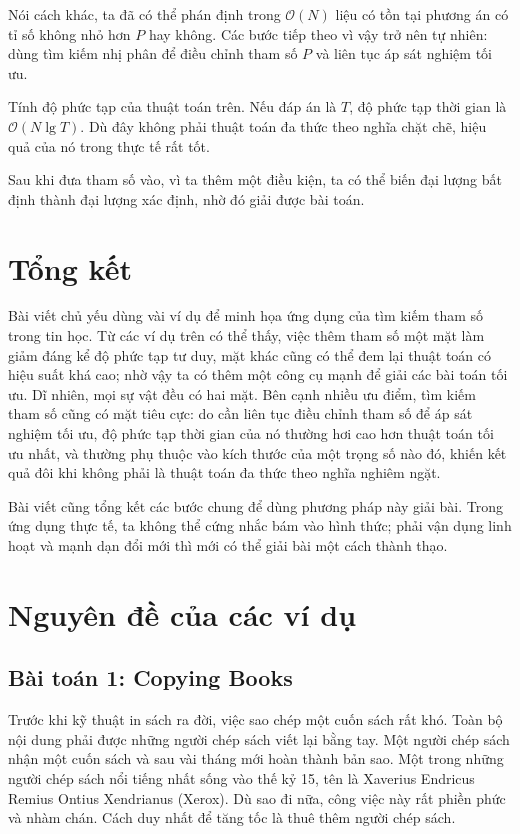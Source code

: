 \documentclass[11pt]{article}
\newcommand{\Oh}{\mathcal{O}}
\begin{document}
Nói cách khác, ta đã có thể phán định trong $\Oh(N)$ liệu có tồn tại phương án
có tỉ số không nhỏ hơn $P$ hay không. Các bước tiếp theo vì vậy trở nên tự
nhiên: dùng tìm kiếm nhị phân để điều chỉnh tham số $P$ và liên tục áp sát
nghiệm tối ưu.

Tính độ phức tạp của thuật toán trên. Nếu đáp án là $T$, độ phức tạp thời gian
là $\Oh(N\lg T)$. Dù đây không phải thuật toán đa thức theo nghĩa chặt chẽ,
hiệu quả của nó trong thực tế rất tốt.

Sau khi đưa tham số vào, vì ta thêm một điều kiện, ta có thể biến đại lượng
bất định thành đại lượng xác định, nhờ đó giải được bài toán.

\section{Tổng kết}

Bài viết chủ yếu dùng vài ví dụ để minh họa ứng dụng của tìm kiếm tham số
trong tin học. Từ các ví dụ trên có thể thấy, việc thêm tham số một mặt làm
giảm đáng kể độ phức tạp tư duy, mặt khác cũng có thể đem lại thuật toán có
hiệu suất khá cao; nhờ vậy ta có thêm một công cụ mạnh để giải các bài toán
tối ưu. Dĩ nhiên, mọi sự vật đều có hai mặt. Bên cạnh nhiều ưu điểm, tìm kiếm
tham số cũng có mặt tiêu cực: do cần liên tục điều chỉnh tham số để áp sát
nghiệm tối ưu, độ phức tạp thời gian của nó thường hơi cao hơn thuật toán tối
ưu nhất, và thường phụ thuộc vào kích thước của một trọng số nào đó, khiến kết
quả đôi khi không phải là thuật toán đa thức theo nghĩa nghiêm ngặt.

Bài viết cũng tổng kết các bước chung để dùng phương pháp này giải bài. Trong
ứng dụng thực tế, ta không thể cứng nhắc bám vào hình thức; phải vận dụng linh
hoạt và mạnh dạn đổi mới thì mới có thể giải bài một cách thành thạo.

\appendix
\section{Nguyên đề của các ví dụ}

\subsection{Bài toán 1: Copying Books}

Trước khi kỹ thuật in sách ra đời, việc sao chép một cuốn sách rất khó. Toàn
bộ nội dung phải được những người chép sách viết lại bằng tay. Một người chép
sách nhận một cuốn sách và sau vài tháng mới hoàn thành bản sao. Một trong
những người chép sách nổi tiếng nhất sống vào thế kỷ 15, tên là Xaverius
Endricus Remius Ontius Xendrianus (Xerox). Dù sao đi nữa, công việc này rất
phiền phức và nhàm chán. Cách duy nhất để tăng tốc là thuê thêm người chép
sách.
\end{document}
